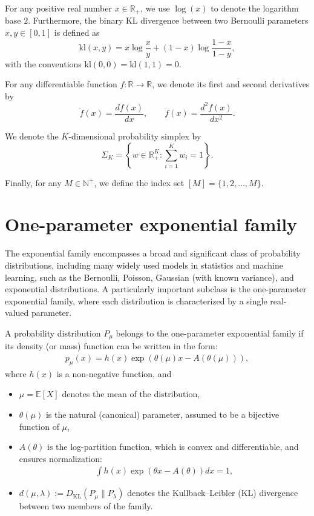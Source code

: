 \documentclass[final]{IEEEtran}
\begin{document}
For any positive real number $x \in \mathbb{R}_+$, we use $\log(x)$ to denote the logarithm base $2$. 
Furthermore, the binary KL divergence between two Bernoulli parameters $x, y \in [0,1]$ is defined as
\begin{equation}
\mathrm{kl}(x, y)
= x \log \frac{x}{y} + (1 - x) \log \frac{1 - x}{1 - y},
\end{equation}
with the conventions $\mathrm{kl}(0,0) = \mathrm{kl}(1,1) = 0$.

For any differentiable function $f: \mathbb{R} \to \mathbb{R}$, we denote its first and second derivatives by
\begin{equation}
\dot{f}(x) = \frac{d f(x)}{d x}, 
\qquad 
\ddot{f}(x) = \frac{d^2 f(x)}{d x^2}.
\end{equation}

We denote the $K$-dimensional probability simplex by
\begin{equation}
\Sigma_K = \left\{ w \in \mathbb{R}_+^K : \sum_{i=1}^K w_i = 1 \right\}.
\end{equation}

Finally, for any $M \in \mathbb{N}^+$, we define the index set $[M] = \{1, 2, \ldots, M\}$.
\section{One-parameter exponential family}
The exponential family encompasses a broad and significant class of probability distributions, including many widely used models in statistics and machine learning, such as the Bernoulli, Poisson, Gaussian (with known variance), and exponential distributions. A particularly important subclass is the one-parameter exponential family, where each distribution is characterized by a single real-valued parameter.

A probability distribution \( P_{\mu} \) belongs to the one-parameter exponential family if its density (or mass) function can be written in the form:
\begin{align}
p_{\mu}(x) = h(x) \exp\left( \theta(\mu) x - A(\theta(\mu)) \right),
\end{align}
where $h(x)$ is a non-negative function, and
\begin{itemize}
\item \( \mu = \mathbb{E}[X] \) denotes the mean of the distribution,
\item \( \theta(\mu) \) is the natural (canonical) parameter, assumed to be a bijective function of \( \mu \),
\item \( A(\theta) \) is the log-partition function, which is convex and differentiable, and ensures normalization:
\begin{align*}
\int h(x) \exp\left( \theta x - A(\theta) \right) dx = 1,
\end{align*}
\item \( d(\mu, \lambda) := D_{\mathrm{KL}}(P_{\mu} \| P_{\lambda}) \) denotes the Kullback–Leibler (KL) divergence between two members of the family.
\end{itemize}
\end{document}
